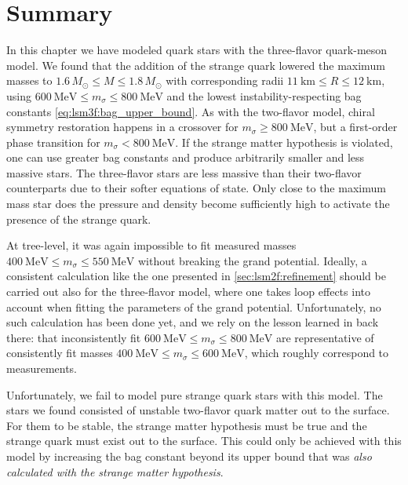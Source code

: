 \section{Summary}

In this chapter we have modeled quark stars with the three-flavor quark-meson model.
We found that the addition of the strange quark lowered the maximum masses to $1.6 \, M_\odot \leq M \leq 1.8 \, M_\odot$
with corresponding radii $\SI{11}{\kilo\meter} \leq R \leq \SI{12}{\kilo\meter}$,
using $\SI{600}{\mega\electronvolt} \leq m_\sigma \leq \SI{800}{\mega\electronvolt}$ and the lowest instability-respecting bag constants \eqref{eq:lsm3f:bag_upper_bound}.
As with the two-flavor model, chiral symmetry restoration happens in a crossover for $m_\sigma \geq \SI{800}{\mega\electronvolt}$,
but a first-order phase transition for $m_\sigma < \SI{800}{\mega\electronvolt}$.
If the strange matter hypothesis is violated, one can use greater bag constants and produce arbitrarily smaller and less massive stars.
The three-flavor stars are less massive than their two-flavor counterparts
due to their softer equations of state.
Only close to the maximum mass star does the pressure and density become sufficiently high
to activate the presence of the strange quark.

At tree-level, it was again impossible to fit measured masses $\SI{400}{\mega\electronvolt} \leq m_\sigma \leq \SI{550}{\mega\electronvolt}$ without breaking the grand potential.
Ideally, a consistent calculation like the one presented in \cref{sec:lsm2f:refinement}
should be carried out also for the three-flavor model,
where one takes loop effects into account when fitting the parameters of the grand potential.
Unfortunately, no such calculation has been done yet,
and we rely on the lesson learned in back there:
that inconsistently fit $\SI{600}{\mega\electronvolt} \leq m_\sigma \leq \SI{800}{\mega\electronvolt}$
are representative of consistently fit masses $\SI{400}{\mega\electronvolt} \leq m_\sigma \leq \SI{600}{\mega\electronvolt}$,
which roughly correspond to measurements.

Unfortunately, we fail to model pure strange quark stars with this model.
The stars we found consisted of unstable two-flavor quark matter out to the surface.
For them to be stable, the strange matter hypothesis must be true and the strange quark must exist out to the surface.
This could only be achieved with this model by
increasing the bag constant beyond its upper bound that was \emph{also calculated with the strange matter hypothesis}.
